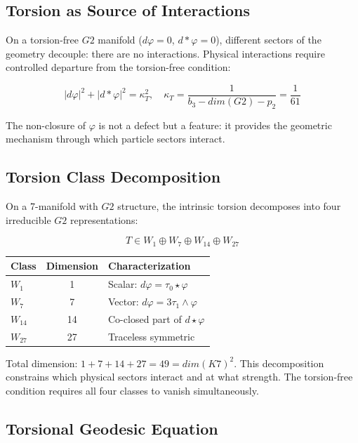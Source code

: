 \documentclass[11pt,a4paper]{article}
\newcommand{\Gtwo}{\mathrm{G}_2}
\newcommand{\Kseven}{K_7}
\newcommand{\dimE}{\mathrm{dim}}
\def\Gtwo{G2}%
\def\Kseven{K7}%
\def\dimE{dim}%
\begin{document}
\subsection{Torsion as Source of Interactions}

On a torsion-free $\Gtwo$ manifold ($d\varphi = 0$, $d{*}\varphi = 0$), different sectors of the geometry decouple: there are no interactions. Physical interactions require controlled departure from the torsion-free condition:

$$|d\varphi|^2 + |d{*}\varphi|^2 = \kappa_T^2, \quad \kappa_T = \frac{1}{b_3 - \dimE(\Gtwo) - p_2} = \frac{1}{61}$$

The non-closure of $\varphi$ is not a defect but a feature: it provides the geometric mechanism through which particle sectors interact.

\subsection{Torsion Class Decomposition}

On a 7-manifold with $\Gtwo$ structure, the intrinsic torsion decomposes into four irreducible $\Gtwo$ representations:

$$T \in W_1 \oplus W_7 \oplus W_{14} \oplus W_{27}$$

\begin{table}[H]
\centering
\begin{tabular}{lcl}
\toprule
Class & Dimension & Characterization \\
\midrule
$W_1$ & 1 & Scalar: $d\varphi = \tau_0 \star\varphi$ \\
$W_7$ & 7 & Vector: $d\varphi = 3\tau_1 \wedge \varphi$ \\
$W_{14}$ & 14 & Co-closed part of $d{\star}\varphi$ \\
$W_{27}$ & 27 & Traceless symmetric \\
\bottomrule
\end{tabular}
\end{table}

Total dimension: $1 + 7 + 14 + 27 = 49 = \dimE(\Kseven)^2$. This decomposition constrains which physical sectors interact and at what strength. The torsion-free condition requires all four classes to vanish simultaneously.

\subsection{Torsional Geodesic Equation}
\end{document}
